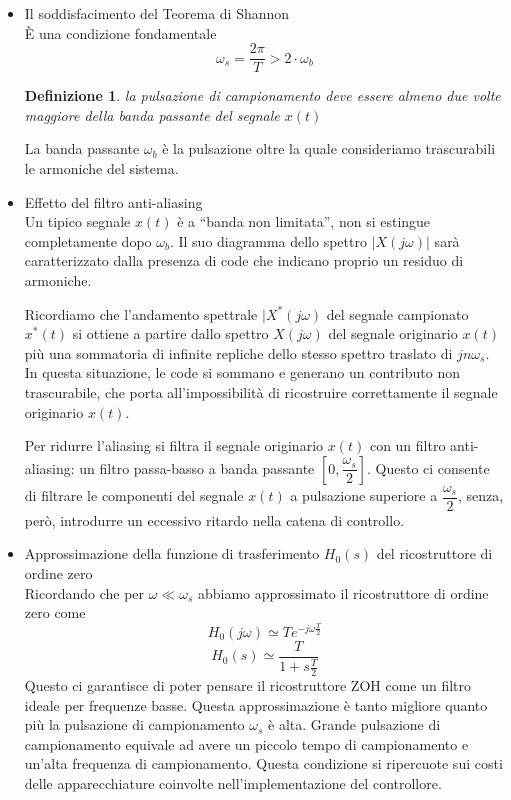 \documentclass[a4paper]{report}
\newtheorem{definizione}{Definizione}
\begin{document}
\begin{itemize}

\item Il soddisfacimento del Teorema di Shannon\\
  \`E una condizione fondamentale
  \[
  \omega_s = \dfrac{2 \pi}{T} > 2\cdot \omega_b
  \]
  \begin{definizione}
    la pulsazione di campionamento deve essere almeno due volte maggiore
    della banda passante del segnale $x(t)$
  \end{definizione}
  La banda passante $\omega_b$ \`e la pulsazione oltre la quale
  consideriamo trascurabili le armoniche del sistema.

\item Effetto del filtro anti-aliasing\\
  Un tipico segnale $x(t)$ \`e a ``banda non limitata'', non si estingue
  completamente dopo $\omega_b$. Il suo diagramma dello spettro $|X(j
  \omega)|$ sar\`a caratterizzato dalla presenza di code che indicano
  proprio un residuo di armoniche.

  Ricordiamo che l'andamento spettrale $|X^{*}(j \omega)$ del segnale
  campionato $x^{*}(t)$ si ottiene a partire dallo spettro $X(j \omega)$
  del segnale originario $x(t)$ pi\`u una sommatoria di infinite
  repliche dello stesso spettro traslato di $j n \omega_s $. In questa
  situazione, le code si sommano e generano un contributo non
  trascurabile, che porta all'impossibilit\`a di ricostruire
  correttamente il segnale originario $x(t)$.

  Per ridurre l'aliasing si filtra il segnale originario $x(t)$ con un
  filtro anti-aliasing: un filtro
  passa-basso a banda passante $\left[ 0,
    \dfrac{\omega_s}{2}\right]$. Questo ci consente di filtrare le
  componenti del segnale $x(t)$ a pulsazione superiore a
  $\dfrac{\omega_s}{2}$, senza, per\`o, introdurre un eccessivo ritardo
  nella catena di controllo.

\item Approssimazione della funzione di trasferimento $H_0(s)$
  del ricostruttore di ordine zero\\
  Ricordando che per $\omega \ll \omega_s$ abbiamo approssimato il
  ricostruttore di ordine zero come
  \[
  H_0(j \omega) \simeq T e^{-j \omega \frac{T}{2}}
  \]
  \[
  H_0(s) \simeq \dfrac{T}{1 + s \frac{T}{2}}
  \]
  Questo ci garantisce di poter pensare il ricostruttore ZOH come un
  filtro ideale per frequenze basse. Questa approssimazione \`e tanto
  migliore quanto pi\`u la pulsazione di campionamento $\omega_s$ \`e
  alta. Grande pulsazione di campionamento equivale ad avere un
  piccolo tempo di campionamento e un'alta frequenza di
  campionamento. Questa condizione si ripercuote sui costi delle
  apparecchiature coinvolte nell'implementazione del controllore.
\end{itemize}
\end{document}
